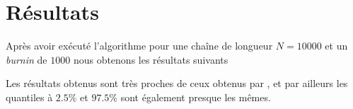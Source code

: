 \section{Résultats}

Après avoir exécuté l'algorithme pour une chaîne de longueur $N=10000$ et un \textit{burnin} de $1000$ nous obtenons les résultats suivants


Les résultats obtenus sont très proches de ceux obtenus par \cite{winbugs_hearts}, et par ailleurs les quantiles à $2.5\%$ et $97.5\%$ sont également presque les mêmes.
